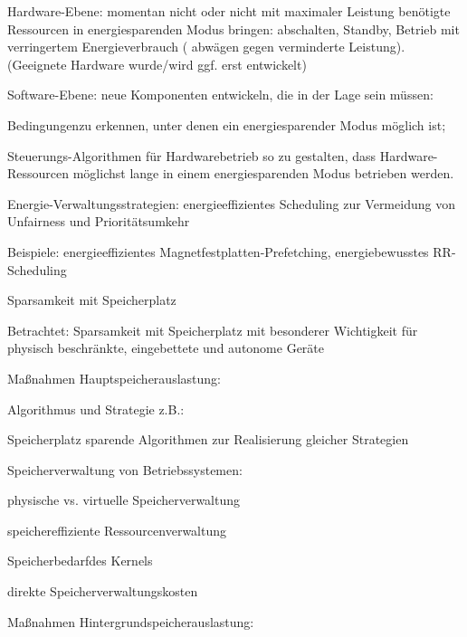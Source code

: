 \documentclass[a4paper]{article}
\begin{document}
\begin{multicols}{3}
    \begin{enumerate*}
        \item
        Hardware-Ebene: momentan nicht oder nicht mit maximaler Leistung
        benötigte Ressourcen in energiesparenden Modus bringen: abschalten,
        Standby, Betrieb mit verringertem Energieverbrauch ( abwägen gegen
        verminderte Leistung). (Geeignete Hardware wurde/wird ggf. erst
        entwickelt)
        \item
        Software-Ebene: neue Komponenten entwickeln, die in der Lage sein
        müssen:
        \begin{itemize*}
            \item Bedingungenzu erkennen, unter denen ein energiesparender Modus möglich ist;
            \item Steuerungs-Algorithmen für Hardwarebetrieb so zu gestalten, dass Hardware-Ressourcen möglichst lange in einem energiesparenden Modus betrieben werden.
            \item Energie-Verwaltungsstrategien: energieeffizientes Scheduling zur Vermeidung von Unfairness und Prioritätsumkehr
            \item Beispiele: energieeffizientes Magnetfestplatten-Prefetching, energiebewusstes RR-Scheduling
        \end{itemize*}
    \end{enumerate*}

    Sparsamkeit mit Speicherplatz

    \begin{itemize*}
        \item
        Betrachtet: Sparsamkeit mit Speicherplatz mit besonderer Wichtigkeit
        für physisch beschränkte, eingebettete und autonome Geräte
        \item
        Maßnahmen Hauptspeicherauslastung:
        \begin{enumerate*}

            \item Algorithmus und Strategie z.B.: \begin{itemize*} \item Speicherplatz sparende Algorithmen zur Realisierung gleicher Strategien \end{itemize*}
            \item Speicherverwaltung von Betriebssystemen: \begin{itemize*} \item physische vs. virtuelle Speicherverwaltung \item speichereffiziente Ressourcenverwaltung \item Speicherbedarfdes Kernels \item direkte Speicherverwaltungskosten \end{itemize*}
        \end{enumerate*}
        \item
        Maßnahmen Hintergrundspeicherauslastung:
        \begin{enumerate*}


\end{enumerate*}
\end{itemize*}
\end{multicols}
\end{document}
